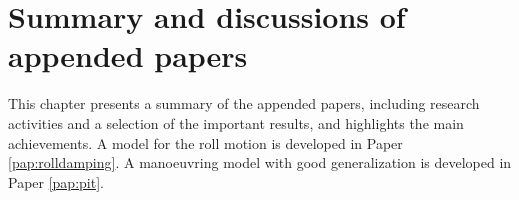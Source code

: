 \chapter{Summary and discussions of appended papers \label{ch:results}}
This chapter presents a summary of the appended papers, including research activities
and a selection of the important results, and highlights the main achievements. A model for the roll motion is developed in Paper \ref{pap:rolldamping}. A manoeuvring model with good generalization is developed in Paper \ref{pap:pit}.



%





